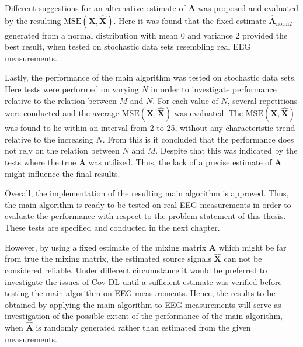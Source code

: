 Different suggestions for an alternative estimate of $\mathbf{A}$ was proposed and evaluated by the resulting $\text{MSE}(\mathbf{X}, \hat{\mathbf{X}})$. 
Here it was found that the fixed estimate $\hat{\mathbf{A}}_{\text{norm2}}$ generated from a normal distribution with mean $0$ and variance $2$ provided the best result, when tested on stochastic data sets resembling real EEG measurements. 

Lastly, the performance of the main algorithm was tested on stochastic data sets. 
Here tests were performed on varying $N$ in order to investigate performance relative to the relation between $M$ and $N$. 
For each value of $N$, several repetitions were conducted and the average $\text{MSE}(\mathbf{X}, \hat{\mathbf{X}})$ was evaluated. 
The $\text{MSE}(\mathbf{X}, \hat{\mathbf{X}})$ was found to lie within an interval from 2 to 25, without any characteristic trend relative to the increasing $N$. 
From this is it concluded that the performance does not rely on the relation between $N$ and $M$. 
Despite that this was indicated by the tests where the true $\mathbf{A}$ was utilized. 
Thus, the lack of a precise estimate of $\mathbf{A}$ might influence the final results. 

Overall, the implementation of the resulting main algorithm is approved. 
Thus, the main algorithm is ready to be tested on real EEG measurements in order to evaluate the performance with respect to the problem statement of this thesis. 
These tests are specified and conducted in the next chapter. 

However, by using a fixed estimate of the mixing matrix $\mathbf{A}$ which might be far from true the mixing matrix, the estimated source signals $\hat{\mathbf{X}}$ can not be considered reliable. 
Under different circumstance it would be preferred to investigate the issues of Cov-DL until a sufficient estimate was verified before testing the main algorithm on EEG measurements.
Hence, the results to be obtained by applying the main algorithm to EEG measurements will serve as investigation of the possible extent of the performance of the main algorithm, when $\hat{\textbf{A}}$ is randomly generated rather than estimated from the given measurements.       